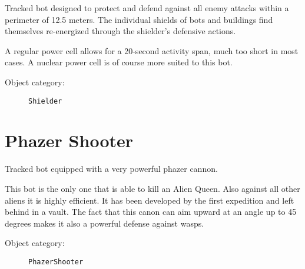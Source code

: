Tracked bot designed to protect and defend against all enemy attacks within a perimeter of 12.5 meters. The individual shields of bots and buildings find themselves re-energized through the shielder's defensive actions.

A regular power cell allows for a 20-second activity span, much too short in most cases. A nuclear power cell is of course more suited to this bot.

\begin{description}
    \item[Object category:] \texttt{Shielder}
\end{description}


\section{Phazer Shooter}

Tracked bot equipped with a very powerful phazer cannon.

This bot is the only one that is able to kill an Alien Queen. Also against all other aliens it is highly efficient. It has been developed by the first expedition and left behind in a vault. The fact that this canon can aim upward at an angle up to 45 degrees makes it also a powerful defense against wasps.

\begin{description}
    \item[Object category:] \texttt{PhazerShooter}
\end{description}